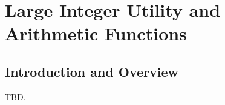 \chapter[Large Integer Utility and Arithmetic Functions]
        {Large Integer Utility and Arithmetic Functions}


\label{claf0}

\section{Introduction and Overview}
\label{claf0:siov0}

TBD.

